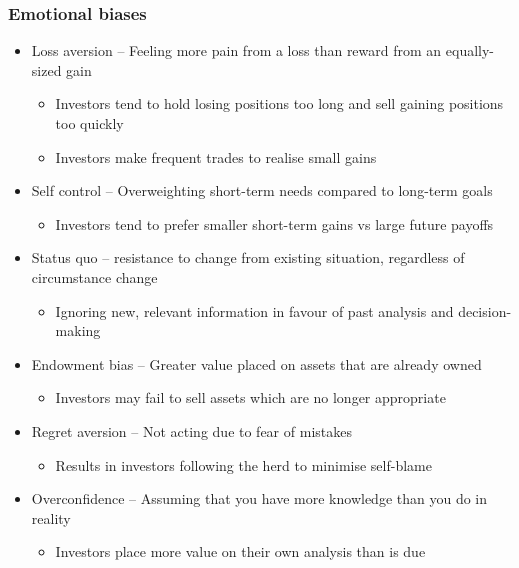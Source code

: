 \documentclass[../notes_compiled.tex]{subfiles}
\begin{document}
\subsubsection{Emotional biases}
\begin{itemize}
\item Loss aversion -- Feeling more pain from a loss than reward from an equally-sized gain
\begin{itemize}
\item Investors tend to hold losing positions too long and sell gaining positions too quickly
\item Investors make frequent trades to realise small gains
\end{itemize}
\item Self control -- Overweighting short-term needs compared to long-term goals
\begin{itemize}
\item Investors tend to prefer smaller short-term gains vs large future payoffs
\end{itemize}
\item Status quo -- resistance to change from existing situation, regardless of circumstance change
\begin{itemize}
\item Ignoring new, relevant information in favour of past analysis and decision-making
\end{itemize}
\item Endowment bias -- Greater value placed on assets that are already owned
\begin{itemize}
\item Investors may fail to sell assets which are no longer appropriate
\end{itemize}
\item Regret aversion -- Not acting due to fear of mistakes
\begin{itemize}
\item Results in investors following the herd to minimise self-blame
\end{itemize}
\item Overconfidence -- Assuming that you have more knowledge than you do in reality
\begin{itemize}
\item Investors place more value on their own analysis than is due
\end{itemize}
\end{itemize}
\end{document}
